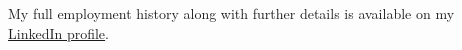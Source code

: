 \begin{justify}
My full employment history along with further details is available on my \href{https://uk.linkedin.com/in/laywill}{LinkedIn profile}.
\end{justify}
\vspace{-\topsep} %
\sectionsep{}
